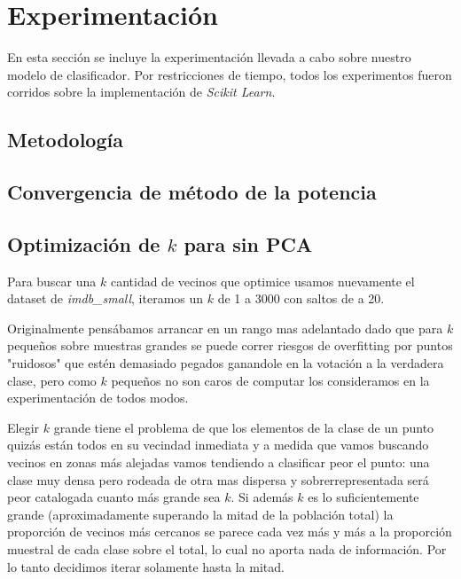 \section{Experimentación}%
\label{sec:experimentacion}

En esta sección se incluye la experimentación llevada a cabo sobre nuestro
modelo de clasificador.
%
Por restricciones de tiempo, todos los experimentos fueron corridos sobre la
implementación de \textit{Scikit Learn}.

\subsection{Metodología}%
\label{sub:metodologia}

\subsection{Convergencia de método de la potencia}%
\label{sub:pm}


\subsection{Optimización de $k$ para \knn{} sin PCA}%
\label{sub:knn_sin_pca}

Para buscar una $k$ cantidad de vecinos que optimice \knn{} usamos nuevamente el dataset de \textit{imdb\_small}, iteramos un $k$ de 1 a 3000 con saltos de a 20.

Originalmente pensábamos arrancar en un rango mas adelantado dado que para $k$ pequeños sobre muestras grandes se puede correr riesgos de overfitting por puntos "ruidosos" que estén demasiado pegados ganandole en la votación a la verdadera clase, pero como $k$ pequeños no son caros de computar los consideramos en la experimentación de todos modos.

Elegir $k$ grande tiene el problema de que los elementos de la clase de un punto quizás están todos en su vecindad inmediata y a medida que vamos buscando vecinos en zonas más alejadas vamos tendiendo a clasificar peor el punto: una clase muy densa pero rodeada de otra mas dispersa y sobrerrepresentada será peor catalogada cuanto más grande sea $k$. Si además $k$ es lo suficientemente grande (aproximadamente superando la mitad de la población total) la proporción de vecinos más cercanos se parece cada vez más y más a la proporción muestral de cada clase sobre el total, lo cual no aporta nada de información. Por lo tanto decidimos iterar solamente hasta la mitad.

